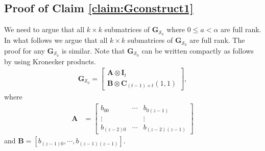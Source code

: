 \documentclass[journal,twocolumn]{IEEEtran}
\theoremstyle{definition}
\newcommand{\calS}{\mathcal{S}}
\newcommand{\bfG}{\mathbf{G}}
\newcommand{\bfI}{\mathbf{I}}
\newcommand{\bfC}{\mathbf{C}}
\newcommand{\bfA}{\mathbf{A}}
\newcommand{\bfB}{\mathbf{B}}
\begin{document}
\subsection*{Proof of Claim \ref{claim:Gconstruct1}}
We need to argue that all $k\times k$ submatrices of $\bfG_{\calS_{a}}$ where $0\le a< \alpha$ are full rank. In what follows we argue that all $k\times k$ submatrices of $\bfG_{\calS_0}$ are full rank. The proof for any $\bfG_{\calS_a}$ is similar. Note that $\bfG_{\calS_0}$ can be written compactly as follows by using Kronecker products.
\begin{align*}
	\bfG_{\calS_0}=
	\begin{bmatrix}
		\bfA\otimes \bfI_t \\
		\bfB\otimes \bfC_{(t-1)\times t}(1,1)
	\end{bmatrix},
\end{align*}
where 	
\begin{align*}
\bfA &=
\begin{bmatrix}
b_{00}&\cdots&b_{0(z-1)}\\
\vdots&&\vdots\\
b_{(z-2)0}&\cdots&b_{(z-2)(z-1)}
\end{bmatrix}
\end{align*}
and $\bfB =[b_{(z-1)0},\cdots,b_{(z-1)(z-1)}]$.
\end{document}
